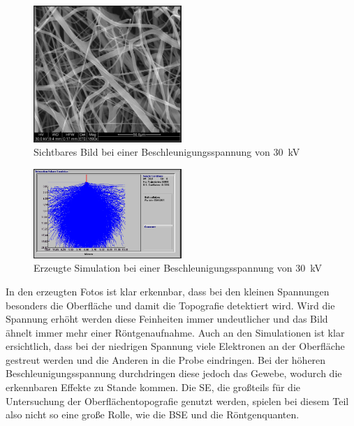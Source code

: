 \documentclass[12pt,english,ngerman]{scrartcl}
\begin{document}
\begin{figure}[H]
	\begin{center}
		\includegraphics[width =0.5\textwidth]{./figures/30kv.png}
	\end{center}
	\caption{Sichtbares Bild bei einer Beschleunigungsspannung von \SI{30}{\kilo\volt}}
    \label{fig:30kv}
\end{figure}

\begin{figure}[H]
	\begin{center}
		\includegraphics[width =0.5\textwidth]{./figures/simulation30kv.png}
	\end{center}
	\caption{Erzeugte Simulation bei einer Beschleunigungsspannung von \SI{30}{\kilo\volt} \cite{sein_foto}}
    \label{fig:simulation30kv}
\end{figure}

In den erzeugten Fotos ist klar erkennbar, dass bei den kleinen Spannungen besonders die Oberfläche und damit die 
Topografie detektiert wird. Wird die Spannung erhöht werden diese Feinheiten immer undeutlicher und das Bild ähnelt 
immer mehr einer Röntgenaufnahme. Auch an den Simulationen ist klar ersichtlich, dass bei der niedrigen Spannung viele
Elektronen an der Oberfläche gestreut werden und die Anderen in die Probe eindringen. Bei der höheren Beschleunigungsspannung
durchdringen diese jedoch das Gewebe, wodurch die erkennbaren Effekte zu Stande kommen. Die SE, die großteils für die 
Untersuchung der Oberflächentopografie genutzt werden, spielen bei diesem Teil also nicht so eine große Rolle, wie die
BSE und die Röntgenquanten.
\end{document}
